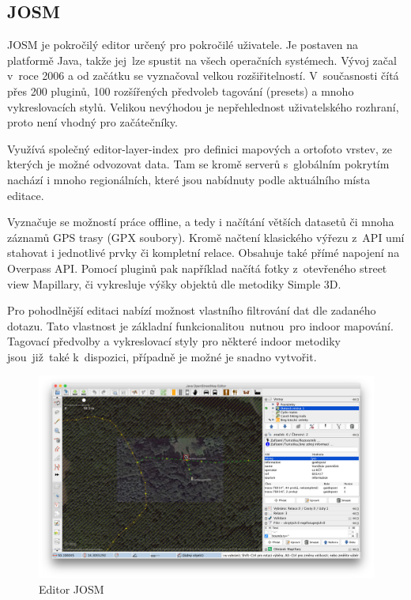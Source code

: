 \subsection{JOSM}\label{josm}

JOSM je pokročilý editor určený pro pokročilé uživatele. Je postaven na platformě Java, takže jej~lze spustit na všech operačních systémech. Vývoj začal v~roce 2006 a od začátku se vyznačoval velkou rozšiřitelností. V~současnosti čítá přes 200 pluginů, 100 rozšířených předvoleb tagování (presets) a mnoho vykreslovacích stylů. Velikou nevýhodou je nepřehlednost uživatelského rozhraní, proto není vhodný pro začátečníky.

Využívá společný editor-layer-index\cite{zdroj44}~pro definici mapových a ortofoto vrstev, ze kterých je možné odvozovat data. Tam se kromě serverů s~globálním pokrytím nachází i mnoho regionálních, které jsou nabídnuty podle aktuálního místa editace.

Vyznačuje se možností práce offline, a tedy i načítání větších datasetů či mnoha záznamů GPS trasy (GPX soubory). Kromě načtení klasického výřezu z~API umí stahovat i jednotlivé prvky či kompletní relace. Obsahuje také přímé napojení na Overpass API. Pomocí pluginů pak například načítá fotky z~otevřeného street view Mapillary, či vykresluje výšky objektů dle metodiky Simple 3D.

Pro pohodlnější editaci nabízí možnost vlastního filtrování dat dle zadaného dotazu. Tato vlastnost je základní funkcionalitou~nutnou~pro indoor mapování. Tagovací předvolby a vykreslovací styly pro některé indoor metodiky jsou~již~také k~dispozici, případně je možné je snadno vytvořit.

 \begin{figure}
	  \centering
      \includegraphics[width=\textwidth]{img/23-editor-josm.png}
      \caption{Editor JOSM}
      \label{obr23}
  \end{figure}

